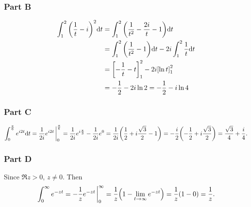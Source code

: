 \documentclass[12pt,titlepage]{extarticle}
\begin{document}
\subsubsection*{Part B}
\begin{align*}
    \int_1^2 \qty(\frac{1}{t} - i)^2 \dd t &= \int_1^2 \qty(\frac{1}{t^2} - \frac{2i}{t} - 1) \dd t \\
    &= \int_1^2 \qty(\frac{1}{t^2} - 1) \dd t - 2i \int_1^2 \frac{1}{t} \dd t \\
    &= \qty[-\frac{1}{t} - t]_1^2 - 2i \qty[\ln t]_1^2 \\
    &= -\frac{1}{2} - 2 i \ln 2 = -\frac{1}{2} - i \ln 4
\end{align*}

\subsubsection*{Part C}
\[
    \int_0^{\frac{\pi}{6}} e^{i 2t} \dd t = \frac{1}{2i} e^{i 2 t} \eval_0^{\frac{\pi}{6}} = \frac{1}{2i} e^{i \frac{\pi}{3}} - \frac{1}{2i} e^{0} = \frac{1}{2i} \qty(\frac{1}{2} + i\frac{\sqrt{3}}{2} - 1) = - \frac{i}{2} \qty(- \frac{1}{2} + i \frac{\sqrt{3}}{2}) = \frac{\sqrt{3}}{4} + \frac{i}{4}
.\]

\subsubsection*{Part D}
Since $\Re z > 0$, $z \neq 0$. Then
\[
    \int_0^\infty e^{-z t} = -\frac{1}{z} e^{-z t} \eval_0^\infty = \frac{1}{z}\qty(1 - \lim_{t \to \infty} e^{-zt}) = \frac{1}{z}\qty(1 - 0) = \frac{1}{z}
.\]
\end{document}
